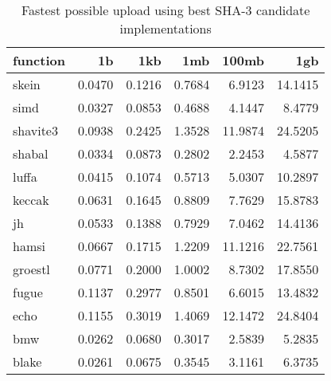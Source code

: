 \begin{table} 
  \centering 
    \begin{tabular}{ | l | r | r | r | r | r | }
      \hline
      \textbf{function} & \textbf{1b} & \textbf{1kb} & \textbf{1mb} & \textbf{100mb} & \textbf{1gb} \\ \hline
      skein & 0.0470 & 0.1216 & 0.7684 & 6.9123 & 14.1415 \\ \hline
      simd & 0.0327 & 0.0853 & 0.4688 & 4.1447 & 8.4779 \\ \hline
      shavite3 & 0.0938 & 0.2425 & 1.3528 & 11.9874 & 24.5205 \\ \hline
      shabal & 0.0334 & 0.0873 & 0.2802 & 2.2453 & 4.5877 \\ \hline
      luffa & 0.0415 & 0.1074 & 0.5713 & 5.0307 & 10.2897 \\ \hline
      keccak & 0.0631 & 0.1645 & 0.8809 & 7.7629 & 15.8783 \\ \hline
      jh & 0.0533 & 0.1388 & 0.7929 & 7.0462 & 14.4136 \\ \hline
      hamsi & 0.0667 & 0.1715 & 1.2209 & 11.1216 & 22.7561 \\ \hline
      groestl & 0.0771 & 0.2000 & 1.0002 & 8.7302 & 17.8550 \\ \hline
      fugue & 0.1137 & 0.2977 & 0.8501 & 6.6015 & 13.4832 \\ \hline
      echo & 0.1155 & 0.3019 & 1.4069 & 12.1472 & 24.8404 \\ \hline
      bmw & 0.0262 & 0.0680 & 0.3017 & 2.5839 & 5.2835 \\ \hline
      blake & 0.0261 & 0.0675 & 0.3545 & 3.1161 & 6.3735 \\ \hline
      \end{tabular} 
      \caption{Fastest possible upload using best SHA-3 candidate implementations}
      \label{tbl:tahoe:optimized_g}
\end{table}

